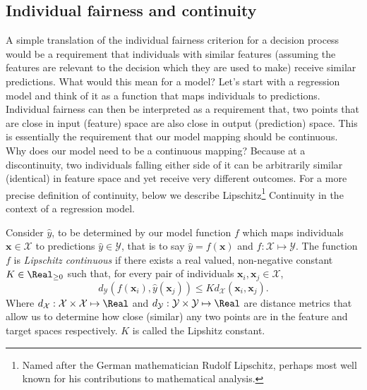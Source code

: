 \subsection{Individual fairness and continuity}

A simple translation of the individual fairness criterion for a decision process would be a requirement that individuals with similar features (assuming the features are relevant to the decision which they are used to make) receive similar predictions. What would this mean for a model? Let's start with a regression model and think of it as a function that maps individuals to predictions. Individual fairness can then be interpreted as a requirement that, two points that are close in input (feature) space are also close in output (prediction) space. This is essentially the requirement that our model mapping should be continuous. Why does our model need to be a continuous mapping? Because at a discontinuity, two individuals falling either side of it can be arbitrarily similar (identical) in feature space and yet receive very different outcomes. For a more precise definition of continuity, below we describe Lipschitz\footnote{Named after the German mathematician Rudolf Lipschitz, perhaps most well known for his contributions to mathematical analysis.} Continuity in the context of a regression model.

\begin{lookbox}
Consider $\hat{y}$, to be determined by our model function $f$ which maps individuals $\boldsymbol{x}\in\mathcal{X}$ to predictions $\hat{y}\in\mathcal{Y}$, that is to say $\hat{y}=f(\boldsymbol{x})$ and $f:\mathcal{X}\mapsto\mathcal{Y}$. The function $f$ is \emph{Lipschitz continuous} if there exists a real valued, non-negative constant $K\in\Real_{\geq 0}$ such that, for every pair of individuals $\boldsymbol{x}_i, \boldsymbol{x}_j \in \mathcal{X}$,
\begin{equation} \label{eq:LipContReg}
d_{\mathcal{Y}}(f(\boldsymbol{x}_i), \hat{y}(\boldsymbol{x}_j)) \leq K d_{\mathcal{X}}(\boldsymbol{x}_i, \boldsymbol{x}_j).
\end{equation}
Where $d_{\mathcal{X}}:\mathcal{X}\times\mathcal{X}\mapsto\Real$ and $d_{\mathcal{Y}}:\mathcal{Y}\times\mathcal{Y}\mapsto\Real$ are distance metrics that allow us to determine how close (similar) any two points are in the feature and target spaces respectively. $K$ is called the Lipshitz constant.
\end{lookbox}

